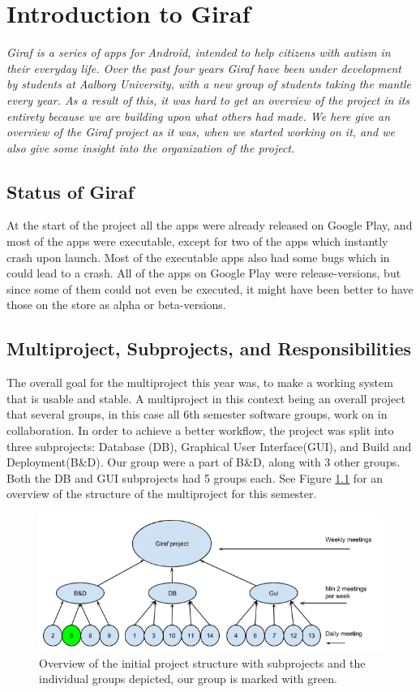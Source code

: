 \chapter{Introduction to Giraf} \label{ChapIntroduction}
\textit{Giraf is a series of apps for Android, intended to help citizens with autism in their everyday life. Over the past four years Giraf have been under development by students at Aalborg University, with a new group of students taking the mantle every year. As a result of this, it was hard to get an overview of the project in its entirety because we are building upon what others had made. We here give an overview of the Giraf project as it was, when we started working on it, and we also give some insight into the organization of the project.}

\section{Status of Giraf} %
At the start of the project all the apps were already released on Google Play, and most of the apps were executable, except for two of the apps which instantly crash upon launch. Most of the executable apps also had some bugs which in could lead to a crash. All of the apps on Google Play were release-versions, but since some of them could not even be executed, it might have been better to have those on the store as alpha or beta-versions.

\section{Multiproject, Subprojects, and Responsibilities} %
The overall goal for the multiproject this year was, to make a working system that is usable and stable. A multiproject in this context being an overall project that several groups, in this case all 6th semester software groups, work on in collaboration. In order to achieve a better workflow, the project was split into three subprojects: Database (DB), Graphical User Interface(GUI), and Build and Deployment(B\&D). Our group were a part of B\&D, along with 3 other groups. Both the DB and GUI subprojects had 5 groups each. See Figure \ref{ScrumOfScrumsOverview} for an overview of the structure of the multiproject for this semester.

\begin{figure}
	\centering
	\includegraphics[width=0.8 \textwidth]{pictures/ScrumOfScrum.png}
	\caption{Overview of the initial project structure with subprojects and the individual groups depicted, our group is marked with green.}
	\label{ScrumOfScrumsOverview}
\end{figure}


